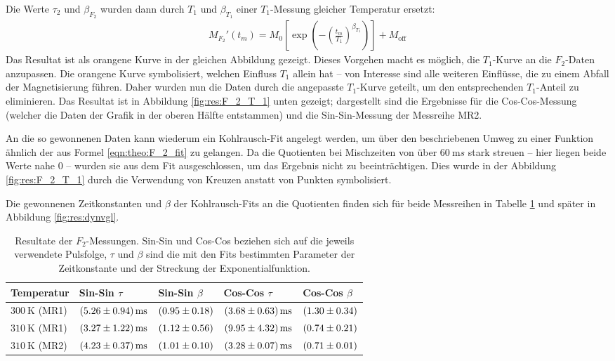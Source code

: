 Die Werte $\tau_2$ und $\beta_{F_2}$ wurden dann durch $T_1$ und $\beta_{T_1}$ einer $T_1$-Messung gleicher Temperatur ersetzt:
\begin{align}
	M_{F_2}' (t_m) = M_0 \left[ \exp{ \left(- { \left( \frac{t_m}{T_1} \right) }^{\beta_{T_1}} \right)} \right] + M_\text{off} \label{eqn:res:F_2_angp}
\end{align}
Das Resultat ist als orangene Kurve in der gleichen Abbildung gezeigt. Dieses Vorgehen macht es möglich, die $T_1$-Kurve an die $F_2$-Daten anzupassen. Die orangene Kurve symbolisiert, welchen Einfluss $T_1$ allein hat -- von Interesse sind alle weiteren Einflüsse, die zu einem Abfall der Magnetisierung führen. Daher wurden nun die Daten durch die angepasste $T_1$-Kurve geteilt, um den entsprechenden $T_1$-Anteil zu eliminieren. Das Resultat ist in Abbildung \ref{fig:res:F_2_T_1} unten gezeigt; dargestellt sind die Ergebnisse für die Cos-Cos-Messung (welcher die Daten der Grafik in der oberen Hälfte entstammen) und die Sin-Sin-Messung der Messreihe MR2.

An die so gewonnenen Daten kann wiederum ein Kohlrausch-Fit angelegt werden, um über den beschriebenen Umweg zu einer Funktion ähnlich der aus Formel \eqref{eqn:theo:F_2_fit} zu gelangen. Da die Quotienten bei Mischzeiten von über $\SI{60}{\milli s}$ stark streuen -- hier liegen beide Werte nahe 0 -- wurden sie aus dem Fit ausgeschlossen, um das Ergebnis nicht zu beeinträchtigen. Dies wurde in der Abbildung \ref{fig:res:F_2_T_1} durch die Verwendung von Kreuzen anstatt von Punkten symbolisiert.

Die gewonnenen Zeitkonstanten und $\beta$ der Kohlrausch-Fits an die Quotienten finden sich für beide Messreihen in Tabelle \ref{tab:res:F_2} und später in Abbildung \ref{fig:res:dynvgl}.
\begin{table}
	\centering
	\begin{tabular}{lllll}
		\hline
		Temperatur & Sin-Sin $\tau$ & Sin-Sin $\beta$ & Cos-Cos $\tau$ & Cos-Cos $\beta$ \\ \hline
		$\SI{300}{\kelvin}$ (MR1) & $\SI{5.26 (94)}{\milli s}$ & $\SI{0.95 (18)}{}$ & $\SI{3.68 (63)}{\milli s}$ & $\SI{1.30 (34)}{}$ \\
		$\SI{310}{\kelvin}$ (MR1) & $\SI{3.27 (122)}{\milli s}$ & $\SI{1.12 (56)}{}$ & $\SI{9.95 (432)}{\milli s}$ & $\SI{0.74 (21)}{}$ \\
		$\SI{310}{\kelvin}$ (MR2) & $\SI{4.23 (37)}{\milli s}$ & $\SI{1.01 (10)}{}$ & $\SI{3.28 (7)}{\milli s}$ & $\SI{0.71 (1)}{}$ \\
		 \hline
	\end{tabular}
	\caption{Resultate der $F_2$-Messungen. Sin-Sin und Cos-Cos beziehen sich auf die jeweils verwendete Pulsfolge, $\tau$ und $\beta$ sind die mit den Fits bestimmten Parameter der Zeitkonstante und der Streckung der Exponentialfunktion. \label{tab:res:F_2}}
\end{table}

